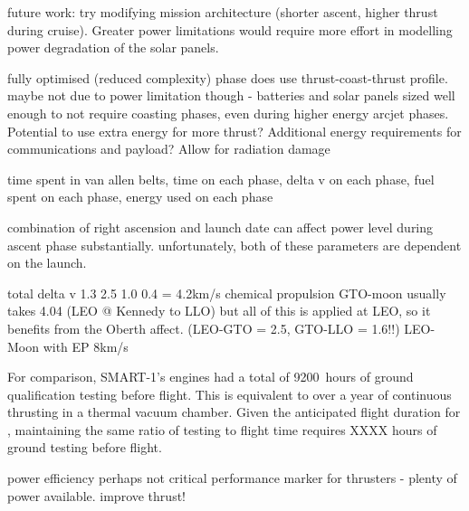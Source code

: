 future work: try modifying mission architecture (shorter ascent, higher thrust during cruise). Greater power limitations would require more effort in modelling power degradation of the solar panels.


fully optimised (reduced complexity) phase does use thrust-coast-thrust profile. maybe not due to power limitation though - batteries and solar panels sized well enough to not require coasting phases, even during higher energy arcjet phases. Potential to use extra energy for more thrust? Additional energy requirements for communications and payload? Allow for radiation damage


time spent in van allen belts, time on each phase, delta v on each phase, fuel spent on each phase, energy used on each phase

combination of right ascension and launch date can affect power level during ascent phase substantially. unfortunately, both of these parameters are dependent on the launch.


total delta v 
1.3 2.5 1.0 0.4 = 4.2km/s
chemical propulsion GTO-moon usually takes 4.04 (LEO @ Kennedy to LLO) but all of this is applied at LEO, so it benefits from the Oberth affect. (LEO-GTO = 2.5, GTO-LLO = 1.6!!)
LEO-Moon with EP 8km/s


For comparison, SMART-1's engines had a total of 9200~hours of ground qualification testing before flight. This is equivalent to over a year of continuous thrusting in a thermal vacuum chamber. Given the anticipated flight duration for \BW, maintaining the same ratio of testing to flight time requires XXXX hours of ground testing before flight.


power efficiency perhaps not critical performance marker for thrusters - plenty of power available. improve thrust! 
